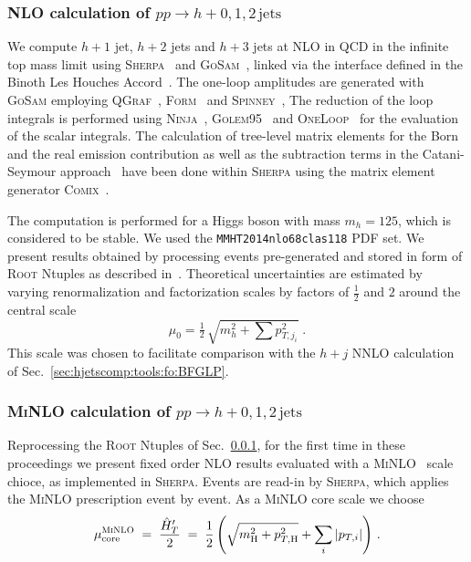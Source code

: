 \subsubsection{NLO calculation of $pp\to h+0,1,2\,\text{jets}$}
\label{sec:hjetscomp:tools:fo:hnj}

We compute $h+1$ jet, $h+2$ jets and
$h+3$ jets at NLO in QCD in the infinite top mass limit
using \textsc{Sherpa}~\cite{Gleisberg:2008ta} and
\textsc{GoSam}~\cite{Cullen:2011ac,Cullen:2014yla}, linked via the
interface defined in the Binoth Les Houches
Accord~\cite{Binoth:2010xt,Alioli:2013nda}.
The one-loop amplitudes are generated with \textsc{GoSam} employing
\textsc{QGraf}~\cite{Nogueira:1991ex},
\textsc{Form}~\cite{Vermaseren:2000nd,Kuipers:2012rf} and
\textsc{Spinney}~\cite{Cullen:2010jv}, The reduction of the loop
integrals is performed using
\textsc{Ninja}~\cite{Mastrolia:2012bu,vanDeurzen:2013saa,Peraro:2014cba},
\textsc{Golem95}~\cite{Heinrich:2010ax,Binoth:2008uq,Cullen:2011kv}
and \textsc{OneLoop}~\cite{vanHameren:2010cp} for the evaluation of
the scalar integrals.
The calculation of tree-level matrix elements for the Born and the
real emission contribution as well as the subtraction terms in the
Catani-Seymour approach~\cite{Catani:1996vz} have been done within
\textsc{Sherpa} using the matrix element generator
\textsc{Comix}~\cite{Gleisberg:2008fv}.

The computation is performed for a Higgs boson with mass
$m_h=125$, which is considered to be stable. We used the 
\texttt{MMHT2014nlo68clas118} PDF set. We present results 
obtained by processing events pre-generated and
stored in form of \textsc{Root} Ntuples as described
in~\cite{Bern:2013zja}. Theoretical
uncertainties are estimated by varying renormalization and
factorization scales by factors of $\tfrac{1}{2}$ and $2$ 
around the central scale
\begin{equation}
  \mu_0 = \tfrac{1}{2}\,\sqrt{m_{h}^2+\sum p_{T,j_i}^2}\;.
\end{equation}
This scale was chosen to facilitate comparison with the $h+j$ NNLO 
calculation of Sec.\ \ref{sec:hjetscomp:tools:fo:BFGLP}.


\subsubsection{\textsc{MiNLO} calculation of $pp\to h+0,1,2\,\text{jets}$}
\label{sec:hjetscomp:tools:fo:hnjminlo}

Reprocessing the \textsc{Root} Ntuples of Sec.\ 
\ref{sec:hjetscomp:tools:fo:hnj}, for the first time in these 
proceedings we present fixed order NLO results evaluated with a
\textsc{MiNLO}~\cite{Hamilton:2012np} scale chioce, as implemented in
\textsc{Sherpa}. Events are read-in by \textsc{Sherpa}, which applies
the \textsc{MiNLO} prescription event by event. As a \textsc{MiNLO}
core scale we choose
\begin{equation}
  \mu_\text{core}^\text{\textsc{MiNLO}}
  \;=\;\frac{\hat{H}^\prime_T}{2}
  \;=\;\frac{1}{2}\left(\sqrt{m_{\mathrm{H}}^{2}+p_{T,\mathrm{H}}^{2}}+\sum_{i}|p_{T,i}|\right)\,.
\end{equation}


